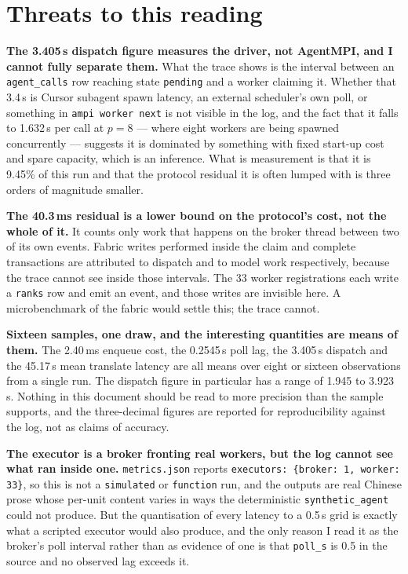 \documentclass[11pt]{article}
\begin{document}
\section{Threats to this reading}

\textbf{The 3.405\,s dispatch figure measures the driver, not AgentMPI, and I cannot fully
separate them.} What the trace shows is the interval between an \texttt{agent\_calls} row reaching
state \texttt{pending} and a worker claiming it. Whether that 3.4\,s is Cursor subagent spawn
latency, an external scheduler's own poll, or something in \texttt{ampi worker next} is not
visible in the log, and the fact that it falls to 1.632\,s per call at $p=8$ --- where eight
workers are being spawned concurrently --- suggests it is dominated by something with fixed
start-up cost and spare capacity, which is an inference. What is measurement is that it is
9.45\% of this run and that the protocol residual it is often lumped with is three orders of
magnitude smaller.

\textbf{The 40.3\,ms residual is a lower bound on the protocol's cost, not the whole of it.} It
counts only work that happens on the broker thread between two of its own events. Fabric writes
performed inside the claim and complete transactions are attributed to dispatch and to model work
respectively, because the trace cannot see inside those intervals. The 33 worker registrations
each write a \texttt{ranks} row and emit an event, and those writes are invisible here. A
microbenchmark of the fabric would settle this; the trace cannot.

\textbf{Sixteen samples, one draw, and the interesting quantities are means of them.} The
2.40\,ms enqueue cost, the 0.2545\,s poll lag, the 3.405\,s dispatch and the 45.17\,s mean
translate latency are all means over eight or sixteen observations from a single run. The
dispatch figure in particular has a range of 1.945 to 3.923\,s. Nothing in this document should be
read to more precision than the sample supports, and the three-decimal figures are reported for
reproducibility against the log, not as claims of accuracy.

\textbf{The executor is a broker fronting real workers, but the log cannot see what ran inside
one.} \texttt{metrics.json} reports \texttt{executors: \{broker: 1, worker: 33\}}, so this is not
a \texttt{simulated} or \texttt{function} run, and the outputs are real Chinese prose whose
per-unit content varies in ways the deterministic \texttt{synthetic\_agent} could not produce. But
the quantisation of every latency to a 0.5\,s grid is exactly what a scripted executor would also
produce, and the only reason I read it as the broker's poll interval rather than as evidence of
one is that \texttt{poll\_s} is 0.5 in the source and no observed lag exceeds it.
\end{document}

